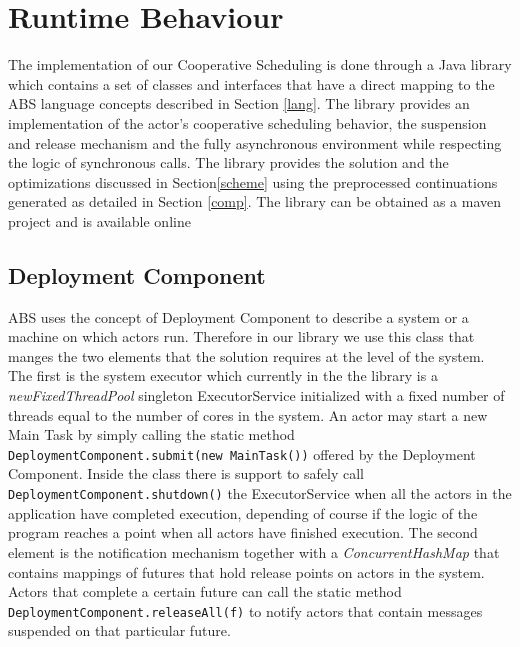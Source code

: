 \section{Runtime Behaviour}
\label{run}
The implementation of our Cooperative Scheduling is done through a Java library which contains a set of classes and interfaces that have a direct mapping to the ABS language concepts described in Section \ref{lang}. The library provides an implementation of the actor's cooperative scheduling behavior, the suspension and release mechanism and the fully asynchronous environment while respecting the logic of synchronous calls. The library provides the solution and the optimizations discussed in Section\ref{scheme} using the preprocessed continuations generated as detailed in Section \ref{comp}. The library can be obtained as a maven project and is available online\cite{library}

\subsection{Deployment Component}
ABS uses the concept of Deployment Component to describe a system or a machine on which actors run. Therefore in our library we use this class that manges the two elements that the solution requires at the level of the system. The first is the system executor which currently in the the library is a \textit{newFixedThreadPool} singleton ExecutorService initialized with a fixed number of threads equal to the number of cores in the system. An actor may start a new Main Task by simply calling the static method \lstinline|DeploymentComponent.submit(new MainTask())| offered by the Deployment Component. Inside the class there is support to safely call \lstinline|DeploymentComponent.shutdown()| the ExecutorService when all the actors in the application have completed execution, depending of course if the logic of the program reaches a point when all actors have finished execution. The second element is the notification mechanism together with a \textit{ConcurrentHashMap} that contains mappings of futures that hold release points on actors in the system. Actors that complete a certain future can call the static method \lstinline|DeploymentComponent.releaseAll(f)| to notify actors that contain messages suspended on that particular future. 


